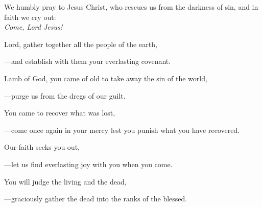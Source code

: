 \intercessions\indent

\begin{hangpar}

We humbly pray to Jesus Christ, who rescues us from the darkness of sin, and in faith we cry out:\\
\emph{Come, Lord Jesus!}

\medskip Lord, gather together all the people of the earth,

{\color{red}---\thinspace}and establish with them your everlasting covenant.

\medskip Lamb of God, you came of old to take away the sin of the world,

{\color{red}---\thinspace}purge us from the dregs of our guilt.

\medskip You came to recover what was lost,

{\color{red}---\thinspace}come once again in your mercy lest you punish what you have recovered.

\medskip Our faith seeks you out,

{\color{red}---\thinspace}let us find everlasting joy with you when you come.

\medskip You will judge the living and the dead,

{\color{red}---\thinspace}graciously gather the dead into the ranks of the blessed.

\end{hangpar}